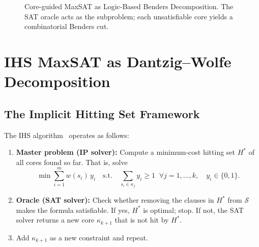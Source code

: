 \documentclass[11pt,a4paper]{article}
\begin{document}
\begin{figure}[t]
\centering
{}
\caption{Core-guided MaxSAT as Logic-Based Benders Decomposition. The SAT oracle acts as the subproblem; each unsatisfiable core yields a combinatorial Benders cut.}
\label{fig:benders}
\end{figure}

\section{IHS MaxSAT as Dantzig--Wolfe Decomposition}
\label{sec:dw}

\subsection{The Implicit Hitting Set Framework}

The IHS algorithm~\citep{davies2011solving,moreno2013implicit} operates as follows:
\begin{enumerate}
\item \textbf{Master problem (IP solver):} Compute a minimum-cost hitting set $H^*$ of all cores found so far. That is, solve
\[
\min \sum_{i=1}^{m} w(s_i)\, y_i \quad \text{s.t.} \quad \sum_{s_i \in \kappa_j} y_i \geq 1 \;\; \forall j = 1,\ldots,k, \quad y_i \in \{0,1\}.
\]
\item \textbf{Oracle (SAT solver):} Check whether removing the clauses in $H^*$ from $\mathcal{S}$ makes the formula satisfiable. If yes, $H^*$ is optimal; stop. If not, the SAT solver returns a new core $\kappa_{k+1}$ that is not hit by $H^*$.
\item Add $\kappa_{k+1}$ as a new constraint and repeat.
\end{enumerate}
\end{document}
